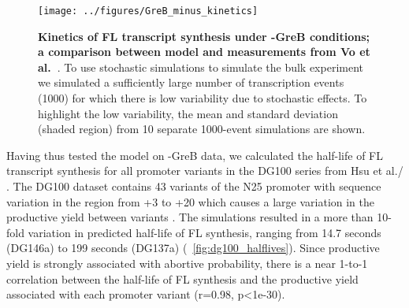\begin{figure}[h]
    \begin{center}
        \texttt{[image: ../figures/GreB\_minus\_kinetics]}
    \end{center}
    \caption{ {\bf Kinetics of FL transcript synthesis under -GreB conditions;
        a comparison between model and measurements from Vo
      et al.~\cite{vo_vitro_2003-1}}. To use stochastic simulations to
      simulate the bulk experiment we simulated a sufficiently large number of
      transcription events (1000) for which there is low variability due to
      stochastic effects. To highlight the low variability, the mean and
      standard deviation (shaded region) from 10 separate 1000-event
      simulations are shown.}
\label{fig:vo_comparison}

\end{figure}
Having thus tested the model on -GreB data, we calculated the half-life of FL
transcript synthesis for all promoter variants in the DG100 series from
Hsu et al./ \cite{hsu_initial_2006}. The DG100 dataset contains 43 variants of
the N25 promoter with sequence variation in the region from +3 to +20 which
causes a large variation in the productive yield between variants
\cite{hsu_initial_2006}. The simulations resulted in a more than 10-fold
variation in predicted half-life of FL synthesis, ranging from 14.7 seconds
(DG146a) to 199 seconds (DG137a) (\FIG~\ref{fig:dg100_halflives}). Since
productive yield is strongly associated with abortive probability, there is a
near 1-to-1 correlation between the half-life of FL synthesis and the
productive yield associated with each promoter variant (r=0.98, p<1e-30).

